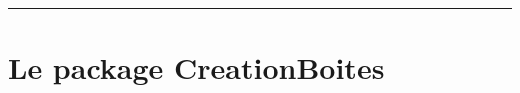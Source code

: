 \documentclass[french,11pt,a4paper]{article}
\begin{document}
\begin{tcolorbox}[colframe=lightgray,colback=white]
\begin{BoiteDeDemo}
	\lipsum[1][1]
\end{BoiteDeDemo}

\begin{BoiteDeDemo}[Compteur=false]
	\lipsum[1][1]
\end{BoiteDeDemo}

\begin{BoiteDeDemo}[Pluriel]
	\lipsum[1][1]
\end{BoiteDeDemo}

\begin{BoiteDeDemo}[SousTitre={Un petit sous-titre}]
	\lipsum[1][1]
\end{BoiteDeDemo}

\begin{BoiteDeDemo}[ComplementTitre={ - Un complément de titre}]%
	\lipsum[1][1]
\end{BoiteDeDemo}

\begin{BoiteDeDemo}[ModifLabel={ super important}]%
	\lipsum[1][1]
\end{BoiteDeDemo}

\begin{BoiteDeDemo}[Logo={example-image}]
	\lipsum[1][1]
\end{BoiteDeDemo}

\begin{BoiteDeDemo}[Icone={\faLightbulb}]
	\lipsum[1][1]
\end{BoiteDeDemo}

\begin{BoiteDanger}[Compteur=false,Emoji=snake]
	\lipsum[1][1]
\end{BoiteDanger}
\end{tcolorbox}

\vfill~

\pagebreak


\hypertarget{matoc}{}

\tableofcontents

\vspace*{5mm}

\hrule

\vspace*{5mm}

\section{Le package CreationBoites}
\end{document}
